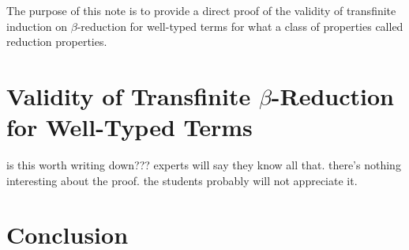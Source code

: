 \documentclass[11pt,twoside]{article}
\begin{document}
The purpose of this note is to provide a direct proof of the validity of transfinite
induction on $\beta$-reduction for well-typed terms for what a class of properties called
reduction properties.

\section{Validity of Transfinite $\beta$-Reduction for Well-Typed Terms}

is this worth writing down???  experts will say they know all that.  there's nothing
interesting about the proof.  the students probably will not appreciate it.


\section{Conclusion}



\end{document}
